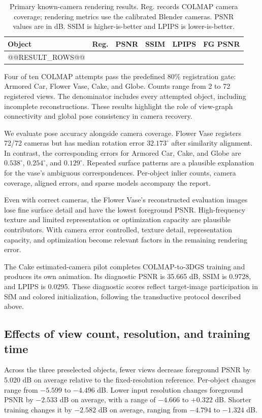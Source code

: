 \documentclass{article}
\begin{document}
\begin{table}[t]
\caption{Primary known-camera rendering results. Reg. records COLMAP camera coverage; rendering metrics use the calibrated Blender cameras. PSNR values are in dB. SSIM is higher-is-better and LPIPS is lower-is-better.}
\label{tab:results}\centering\small
\begin{tabular}{lrrrrr}
\toprule
Object & Reg. & PSNR & SSIM & LPIPS & FG PSNR\\
\midrule
@@RESULT_ROWS@@
\bottomrule
\end{tabular}
\end{table}

Four of ten COLMAP attempts pass the predefined 80\% registration gate: Armored Car, Flower Vase, Cake, and Globe. Counts range from 2 to 72 registered views. The denominator includes every attempted object, including incomplete reconstructions. These results highlight the role of view-graph connectivity and global pose consistency in camera recovery.

We evaluate pose accuracy alongside camera coverage. Flower Vase registers 72/72 cameras but has median rotation error $32.173^\circ$ after similarity alignment. In contrast, the corresponding errors for Armored Car, Cake, and Globe are $0.538^\circ$, $0.254^\circ$, and $0.129^\circ$. Repeated surface patterns are a plausible explanation for the vase's ambiguous correspondences. Per-object inlier counts, camera coverage, aligned errors, and sparse models accompany the report.

Even with correct cameras, the Flower Vase's reconstructed evaluation images lose fine surface detail and have the lowest foreground PSNR. High-frequency texture and limited representation or optimization capacity are plausible contributors. With camera error controlled, texture detail, representation capacity, and optimization become relevant factors in the remaining rendering error.

The Cake estimated-camera pilot completes COLMAP-to-3DGS training and produces its own animation. Its diagnostic PSNR is 35.665 dB, SSIM is 0.9728, and LPIPS is 0.0295. These diagnostic scores reflect target-image participation in SfM and colored initialization, following the transductive protocol described above.

\subsection{Effects of view count, resolution, and training time}
Across the three preselected objects, fewer views decrease foreground PSNR by 5.020 dB on average relative to the fixed-resolution reference. Per-object changes range from $-5.599$ to $-4.496$ dB. Lower input resolution changes foreground PSNR by $-2.533$ dB on average, with a range of $-4.666$ to $+0.322$ dB. Shorter training changes it by $-2.582$ dB on average, ranging from $-4.794$ to $-1.324$ dB.
\end{document}
